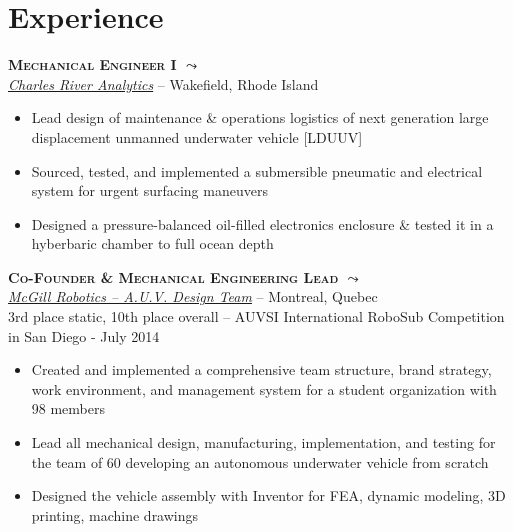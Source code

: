 \documentclass[11pt, letterpaper]{article}
\newcommand{\years}[1]{\marginnote{\footnotesize #1}} %
\begin{document}
  \section*{Experience}

  \begin{samepage}
    \years{9/2014 - Present} \textbf{\scshape Mechanical Engineer I \href{http://www.http://michaelelliotking.com/blog/first-job/}{$\leadsto$}}\\
    \href {http://www.cra.com}{\textit{Charles River Analytics}} -- Wakefield, Rhode Island
    \begin{itemize}
      \item Lead design of maintenance \& operations logistics of next generation large displacement unmanned underwater vehicle [LDUUV]
      \item Sourced, tested, and implemented a submersible pneumatic and electrical system for urgent surfacing maneuvers
      \item Designed a pressure-balanced oil-filled electronics enclosure \& tested it in a hyberbaric chamber to full ocean depth
    \end{itemize}
  \end{samepage}

  \begin{samepage}
    \years{8/2013 - 8/2014} \textbf{\scshape Co-Founder \& Mechanical Engineering Lead \href{http://www.michaelelliotking.com/projects/mcgillrobotics}{$\leadsto$}}\\
    \href {http://www.mcgillrobotics.com}{\textit{McGill Robotics -- A.U.V. Design Team}} -- Montreal, Quebec\\
    {\small 3rd place static, 10th place overall -- AUVSI International RoboSub Competition in San Diego - July 2014}
    \begin{itemize}
      \item Created and implemented a comprehensive team structure, brand strategy, work environment, and management system for a student organization with 98 members
      \item Lead all mechanical design, manufacturing, implementation, and testing for the team of 60 developing an autonomous underwater vehicle from scratch
      \item Designed the vehicle assembly with Inventor for FEA, dynamic modeling, 3D printing, machine drawings 
    \end{itemize}
  \end{samepage}
\end{document}
